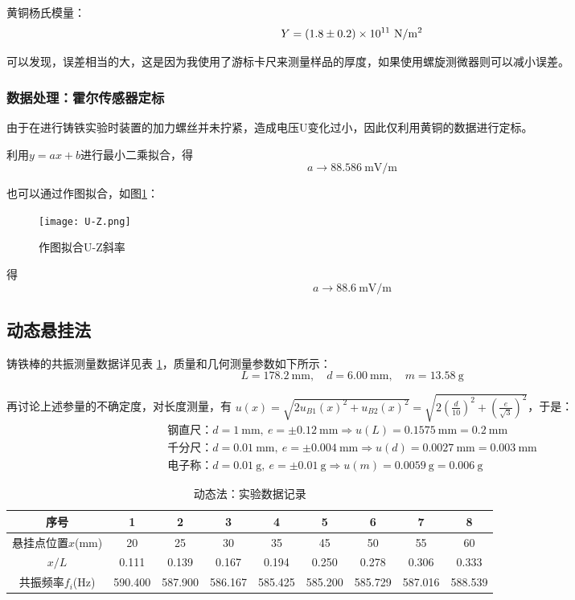 \documentclass[11pt]{article}
\begin{document}
	黄铜杨氏模量：
	\[Y=(1.8 \pm 0.2)\times 10^{11}\,\,{\rm N/m^2}\]
	
	可以发现，误差相当的大，这是因为我使用了游标卡尺来测量样品的厚度，如果使用螺旋测微器则可以减小误差。
	
	\subsubsection{数据处理：霍尔传感器定标}
	由于在进行铸铁实验时装置的加力螺丝并未拧紧，造成电压U变化过小，因此仅利用黄铜的数据进行定标。
	
	利用$y=ax+b$进行最小二乘拟合，得
	\[a \to 88.586\ \mathrm{mV/m}\]
	
	也可以通过作图拟合，如图\ref{fig:U-Z}：
	\begin{figure}[H]
		\centering
		\texttt{[image: U-Z.png]}
		\caption{作图拟合U-Z斜率}
		\label{fig:U-Z}
	\end{figure}
	
	得
	\[a \to 88.6\ \mathrm{mV/m}\]
	
	\subsection{动态悬挂法}
	铸铁棒的共振测量数据详见表 \ref{tab1}，质量和几何测量参数如下所示：
	\begin{equation*}
		L = 178.2 \ \mathrm{mm},\quad 
		d = 6.00 \ \mathrm{mm},\quad 
		m = 13.58 \ \mathrm{g}
	\end{equation*}
	
	再讨论上述参量的不确定度，对长度测量，有 $u(x) = \sqrt{2 u_{B1}(x)^2 + u_{B2}(x)^2 } = \sqrt{ 2 \left(\frac{d}{10}\right)^2 + \left(\frac{e}{\sqrt{3}}\right)^2 }$，于是：
	\begin{gather*}
		\text{钢直尺：} d = 1 \ \mathrm{mm},\ e = \pm 0.12 \ \mathrm{mm} \Longrightarrow u(L) = 0.1575 \ \mathrm{mm} = 0.2 \ \mathrm{mm}\\ 
		\text{千分尺：} d = 0.01 \ \mathrm{mm},\ e = \pm 0.004 \ \mathrm{mm} \Longrightarrow u(d) =  0.0027 \ \mathrm{mm} = 0.003 \ \mathrm{mm}\\ 
		\text{电子称：} d = 0.01 \ \mathrm{g},\ e = \pm 0.01 \ \mathrm{g} \Longrightarrow u(m) = 0.0059 \ \mathrm{g} = 0.006 \ \mathrm{g}
	\end{gather*}
	
	\begin{table}[H]
		\centering
		\caption{动态法：实验数据记录}
		\label{tab1}
		\begin{tabular}{ccccccccc}
			\toprule
			序号 & 1 & 2 & 3 & 4 & 5 & 6 & 7 & 8 \\ 
			\midrule
			悬挂点位置$x$(mm) & 20 & 25 & 30 & 35 & 45 & 50 & 55 & 60 \\ 
			$x/L$ & 0.111  & 0.139  & 0.167  & 0.194  & 0.250  & 0.278  & 0.306  & 0.333  \\ 
			共振频率$f_i$(Hz) & 590.400  & 587.900  & 586.167  & 585.425  & 585.200  & 585.729  & 587.016  & 588.539 \\ 
			\bottomrule
		\end{tabular}
	\end{table}
	
\end{document}
